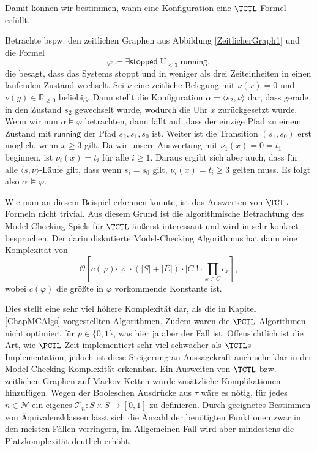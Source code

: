 Damit können wir bestimmen, wann eine Konfiguration eine $\TCTL$-Formel erfüllt.
\begin{example}
	Betrachte bspw. den zeitlichen Graphen aus Abbildung \ref{ZeitlicherGraph1} und die Formel 
	$$\varphi\coloneqq \exists\mathsf{stopped}\operatorname{U}_{< 3} \mathsf{running},$$ die besagt, dass das Systems stoppt und in weniger als drei Zeiteinheiten in einen laufenden Zustand wechselt.
	Sei $\nu$ eine zeitliche Belegung mit $\nu(x)=0$ und $\nu(y)\in \mathbb{R}_{\geq 0}$ beliebig.
	Dann stellt die Konfiguration $\alpha = \langle s_2,\nu \rangle$ dar, dass gerade in den Zustand $s_2$ gewechselt wurde, wodurch die Uhr $x$ zurückgesetzt wurde.
	Wenn wir nun $\alpha \models \varphi$ betrachten, dann fällt auf, dass der einzige Pfad zu einem Zustand mit $\mathsf{running}$ der Pfad $s_2, s_1,s_0$ ist. 
	Weiter ist die Transition $(s_1,s_0)$ erst möglich, wenn $x\geq 3$ gilt.
	Da wir unsere Auswertung mit $\nu_1(x)=0=t_1$ beginnen, ist $\nu_i(x)=t_i$ für alle $i\geq 1$.
	Daraus ergibt sich aber auch, dass für alle $\langle s,\nu \rangle$-Läufe gilt, dass wenn $s_i = s_0$ gilt, $\nu_i(x)=t_i \geq 3$ gelten muss.
	Es folgt also $\alpha \not\models \varphi$.
\end{example}

Wie man an diesem Beispiel erkennen konnte, ist das Auswerten von $\TCTL$-Formeln nicht trivial.
Aus diesem Grund ist die algorithmische Betrachtung des Model-Checking Spiels für $\TCTL$ äußerst interessant und wird in \cite{alur1990model} sehr konkret besprochen.
Der darin diskutierte Model-Checking Algorithmus hat dann eine Komplexität von 
$$\mathcal{O}\left[c(\varphi)\cdot \vert\varphi\vert \cdot (|S|+|E|) \cdot |C|! \cdot \prod_{x\in C}c_x\right],$$ 
wobei $c(\varphi)$ die größte in $\varphi$ vorkommende Konstante ist. \cite{alur1990model}

Dies stellt eine sehr viel höhere Komplexität dar, als die in Kapitel \ref{ChapMCAlgs} vorgestellten Algorithmen.
Zudem waren die $\PCTL$-Algorithmen nicht optimiert für $p\in \{0,1\}$, was hier ja aber der Fall ist.
Offensichtlich ist die Art, wie $\PCTL$ Zeit implementiert sehr viel schwächer als $\TCTL$s Implementation, jedoch ist diese Steigerung an Aussagekraft auch sehr klar in der Model-Checking Komplexität erkennbar.
Ein Ausweiten von $\TCTL$ bzw. zeitlichen Graphen auf Markov-Ketten würde zusätzliche Komplikationen hinzufügen.
Wegen der Booleschen Ausdrücke aus $\tau$ wäre es nötig, für jedes $n\in \mathcal{N}$ ein eigenes $\mathcal{T}_n:S\times S\to [0,1]$ zu definieren.
Durch geeignetes Bestimmen von Äquivalenzklassen lässt sich die Anzahl der benötigten Funktionen zwar in den meisten Fällen verringern, im Allgemeinen Fall wird aber mindestens die Platzkomplexität deutlich erhöht.

